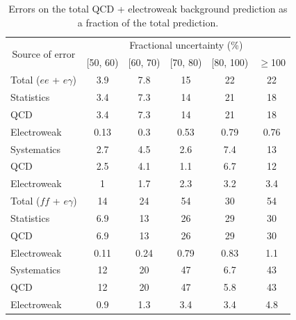 \documentclass[dissertation_bw.tex]{subfiles}
\begin{document}
\begin{table}[hcbp]
\caption{Errors on the total QCD + electroweak background prediction as a fraction of the total prediction.}
\centering
\begin{tabular}{|p{5cm}|c|c|c|c|c|}
\hline
\multicolumn{1}{|c|}{\multirow{2}{*}{Source of error}} & \multicolumn{5}{c|}{Fractional uncertainty (\%)} \\
\cline{2-6}
& [50, 60) & [60, 70) & [70, 80) & [80, 100) & $\geq$100 \\
\hline
\hline
Total ($ee$ + $e\gamma$) & 3.9 & 7.8 & 15 & 22 & 22 \\
\hline
\hspace{0.5cm}Statistics & 3.4 & 7.3 & 14 & 21 & 18 \\
\hline
\hspace{1cm}QCD & 3.4 & 7.3 & 14 & 21 & 18 \\
\hspace{1cm}Electroweak & 0.13 & 0.3 & 0.53 & 0.79 & 0.76 \\
\hline
\hspace{0.5cm}Systematics & 2.7 & 4.5 & 2.6 & 7.4 & 13 \\
\hline
\hspace{1cm}QCD & 2.5 & 4.1 & 1.1 & 6.7 & 12 \\
\hspace{1cm}Electroweak & 1 & 1.7 & 2.3 & 3.2 & 3.4 \\
\hline
Total ($\mathit{ff}$ + $e\gamma$) & 14 & 24 & 54 & 30 & 54 \\
\hline
\hspace{0.5cm}Statistics & 6.9 & 13 & 26 & 29 & 30 \\
\hline
\hspace{1cm}QCD & 6.9 & 13 & 26 & 29 & 30 \\
\hspace{1cm}Electroweak & 0.11 & 0.24 & 0.79 & 0.83 & 1.1 \\
\hline
\hspace{0.5cm}Systematics & 12 & 20 & 47 & 6.7 & 43 \\
\hline
\hspace{1cm}QCD & 12 & 20 & 47 & 5.8 & 43 \\
\hspace{1cm}Electroweak & 0.9 & 1.3 & 3.4 & 3.4 & 4.8 \\
\hline

\end{tabular}
\end{table}
\end{document}
